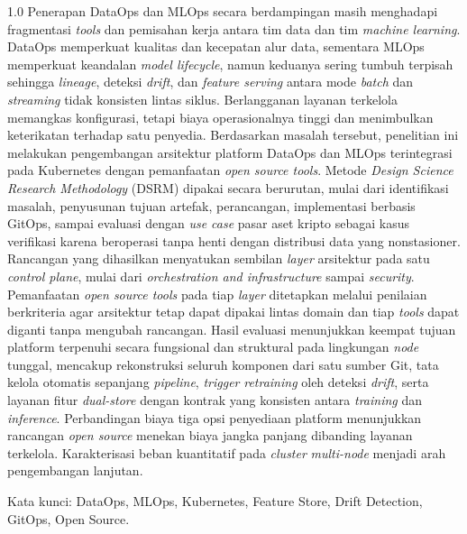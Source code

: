 \begin{spacing}{1.0}
Penerapan DataOps dan MLOps secara berdampingan masih menghadapi fragmentasi \textit{tools} dan pemisahan kerja antara tim data dan tim \textit{machine learning}. DataOps memperkuat kualitas dan kecepatan alur data, sementara MLOps memperkuat keandalan \textit{model lifecycle}, namun keduanya sering tumbuh terpisah sehingga \textit{lineage}, deteksi \textit{drift}, dan \textit{feature serving} antara mode \textit{batch} dan \textit{streaming} tidak konsisten lintas siklus. Berlangganan layanan terkelola memangkas konfigurasi, tetapi biaya operasionalnya tinggi dan menimbulkan keterikatan terhadap satu penyedia. Berdasarkan masalah tersebut, penelitian ini melakukan pengembangan arsitektur platform DataOps dan MLOps terintegrasi pada Kubernetes dengan pemanfaatan \textit{open source tools}. Metode \textit{Design Science Research Methodology} (DSRM) dipakai secara berurutan, mulai dari identifikasi masalah, penyusunan tujuan artefak, perancangan, implementasi berbasis GitOps, sampai evaluasi dengan \textit{use case} pasar aset kripto sebagai kasus verifikasi karena beroperasi tanpa henti dengan distribusi data yang nonstasioner. Rancangan yang dihasilkan menyatukan sembilan \textit{layer} arsitektur pada satu \textit{control plane}, mulai dari \textit{orchestration and infrastructure} sampai \textit{security}. Pemanfaatan \textit{open source tools} pada tiap \textit{layer} ditetapkan melalui penilaian berkriteria agar arsitektur tetap dapat dipakai lintas domain dan tiap \textit{tools} dapat diganti tanpa mengubah rancangan. Hasil evaluasi menunjukkan keempat tujuan platform terpenuhi secara fungsional dan struktural pada lingkungan \textit{node} tunggal, mencakup rekonstruksi seluruh komponen dari satu sumber Git, tata kelola otomatis sepanjang \textit{pipeline}, \textit{trigger} \textit{retraining} oleh deteksi \textit{drift}, serta layanan fitur \textit{dual-store} dengan kontrak yang konsisten antara \textit{training} dan \textit{inference}. Perbandingan biaya tiga opsi penyediaan platform menunjukkan rancangan \textit{open source} menekan biaya jangka panjang dibanding layanan terkelola. Karakterisasi beban kuantitatif pada \textit{cluster} \textit{multi-node} menjadi arah pengembangan lanjutan.

Kata kunci: DataOps, MLOps, Kubernetes, Feature Store, Drift Detection, GitOps, Open Source.
\end{spacing}
